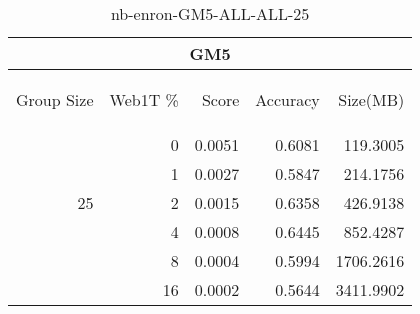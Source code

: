 \begin{center}
\begin{table}[htbp] 
 \begin{center}
\begin{tabular}{ | r | r | r | r | r |}
\hline
\multicolumn{5}{|c|}{GM5}\\
\hline
\begin{sideways}Group Size\end{sideways} & \begin{sideways}Web1T \%\end{sideways} & \begin{sideways}Score\end{sideways} & \begin{sideways}Accuracy\end{sideways} & \begin{sideways}Size(MB)\end{sideways}\\
\hline
\multirow{5}{*}{25}
 & 0 & 0.0051 & 0.6081 & 119.3005\\ \cline{2-5}
 & 1 & 0.0027 & 0.5847 & 214.1756\\ \cline{2-5}
 & 2 & 0.0015 & 0.6358 & 426.9138\\ \cline{2-5}
 & 4 & 0.0008 & 0.6445 & 852.4287\\ \cline{2-5}
 & 8 & 0.0004 & 0.5994 & 1706.2616\\ \cline{2-5}
 & 16 & 0.0002 & 0.5644 & 3411.9902\\ \cline{2-5}
\hline
\end{tabular}
\caption{nb-enron-GM5-ALL-ALL-25}
\label{table:nb-enron-GM5-ALL-ALL-25}
\end{center}
 \end{table}
\end{center}

